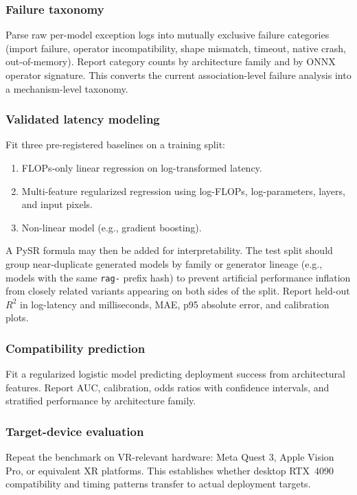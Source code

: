 \documentclass[10pt,twocolumn]{article}
\begin{document}
\subsubsection{Failure taxonomy}

Parse raw per-model exception logs into mutually exclusive failure categories (import failure, operator incompatibility, shape mismatch, timeout, native crash, out-of-memory). Report category counts by architecture family and by ONNX operator signature. This converts the current association-level failure analysis into a mechanism-level taxonomy.

\subsubsection{Validated latency modeling}

Fit three pre-registered baselines on a training split:
\begin{enumerate}[nosep,leftmargin=*]
  \item FLOPs-only linear regression on log-transformed latency.
  \item Multi-feature regularized regression using log-FLOPs, log-parameters, layers, and input pixels.
  \item Non-linear model (e.g., gradient boosting).
\end{enumerate}
A PySR formula may then be added for interpretability. The test split should group near-duplicate generated models by family or generator lineage (e.g., models with the same \texttt{rag-} prefix hash) to prevent artificial performance inflation from closely related variants appearing on both sides of the split. Report held-out $R^2$ in log-latency and milliseconds, MAE, p95 absolute error, and calibration plots.

\subsubsection{Compatibility prediction}

Fit a regularized logistic model predicting deployment success from architectural features. Report AUC, calibration, odds ratios with confidence intervals, and stratified performance by architecture family.

\subsubsection{Target-device evaluation}

Repeat the benchmark on VR-relevant hardware: Meta Quest 3, Apple Vision Pro, or equivalent XR platforms. This establishes whether desktop RTX~4090 compatibility and timing patterns transfer to actual deployment targets.
\end{document}
